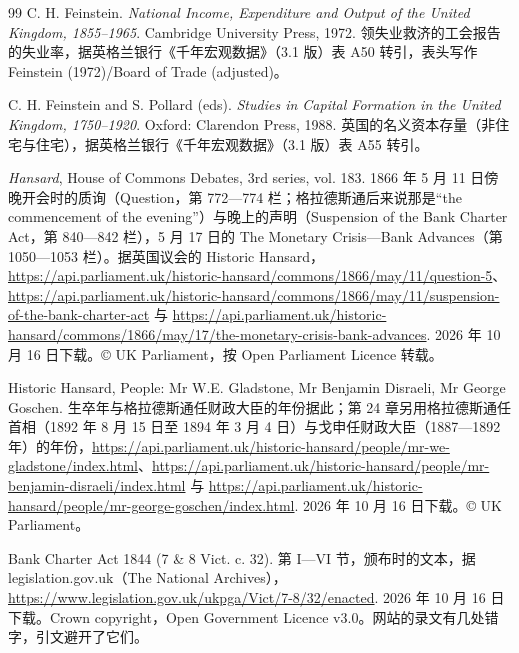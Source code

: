 \begin{thebibliography}{99}
 C. H. Feinstein. \emph{National Income, Expenditure and Output of the United Kingdom, 1855--1965}. Cambridge University Press, 1972. 领失业救济的工会报告的失业率，据英格兰银行《千年宏观数据》（3.1 版）表 A50 转引，表头写作 Feinstein (1972)/Board of Trade (adjusted)。

 C. H. Feinstein and S. Pollard (eds). \emph{Studies in Capital Formation in the United Kingdom, 1750--1920}. Oxford: Clarendon Press, 1988. 英国的名义资本存量（非住宅与住宅），据英格兰银行《千年宏观数据》（3.1 版）表 A55 转引。

 \emph{Hansard}, House of Commons Debates, 3rd series, vol. 183. 1866 年 5 月 11 日傍晚开会时的质询（Question，第 772—774 栏；格拉德斯通后来说那是“the commencement of the evening”）与晚上的声明（Suspension of the Bank Charter Act，第 840—842 栏），5 月 17 日的 The Monetary Crisis—Bank Advances（第 1050—1053 栏）。据英国议会的 Historic Hansard，\url{https://api.parliament.uk/historic-hansard/commons/1866/may/11/question-5}、\url{https://api.parliament.uk/historic-hansard/commons/1866/may/11/suspension-of-the-bank-charter-act} 与 \url{https://api.parliament.uk/historic-hansard/commons/1866/may/17/the-monetary-crisis-bank-advances}. 2026 年 10 月 16 日下载。© UK Parliament，按 Open Parliament Licence 转载。

 Historic Hansard, People: Mr W.E. Gladstone, Mr Benjamin Disraeli, Mr George Goschen. 生卒年与格拉德斯通任财政大臣的年份据此；第 24 章另用格拉德斯通任首相（1892 年 8 月 15 日至 1894 年 3 月 4 日）与戈申任财政大臣（1887—1892 年）的年份，\url{https://api.parliament.uk/historic-hansard/people/mr-we-gladstone/index.html}、\url{https://api.parliament.uk/historic-hansard/people/mr-benjamin-disraeli/index.html} 与 \url{https://api.parliament.uk/historic-hansard/people/mr-george-goschen/index.html}. 2026 年 10 月 16 日下载。© UK Parliament。

 Bank Charter Act 1844 (7 \& 8 Vict. c. 32). 第 I—VI 节，颁布时的文本，据 legislation.gov.uk（The National Archives），\url{https://www.legislation.gov.uk/ukpga/Vict/7-8/32/enacted}. 2026 年 10 月 16 日下载。Crown copyright，Open Government Licence v3.0。网站的录文有几处错字，引文避开了它们。


\end{thebibliography}

